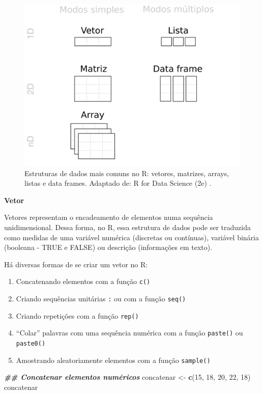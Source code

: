 \documentclass[
]{article}
\newenvironment{Shaded}{\begin{snugshade}}{\end{snugshade}}
\newcommand{\DecValTok}[1]{\textcolor[rgb]{0.00,0.00,0.81}{#1}}
\newcommand{\DocumentationTok}[1]{\textcolor[rgb]{0.56,0.35,0.01}{\textbf{\textit{#1}}}}
\newcommand{\FunctionTok}[1]{\textcolor[rgb]{0.13,0.29,0.53}{\textbf{#1}}}
\newcommand{\NormalTok}[1]{#1}
\newcommand{\OtherTok}[1]{\textcolor[rgb]{0.56,0.35,0.01}{#1}}
\providecommand{\tightlist}{%
  \setlength{\itemsep}{0pt}\setlength{\parskip}{0pt}}
\begin{document}
\begin{figure}
\includegraphics[width=20.03in]{figures/cap04_fig03} \caption{Estruturas de dados mais comuns no R: vetores, matrizes, arrays, listas e data frames. Adaptado de: R for Data Science (2e) .}\label{fig:fig-r-estruturas}
\end{figure}

\textbf{Vetor}

Vetores representam o encadeamento de elementos numa sequência unidimensional. Dessa forma, no R, essa estrutura de dados pode ser traduzida como medidas de uma variável numérica (discretas ou contínuas), variável binária (booleana - TRUE e FALSE) ou descrição (informações em texto).

Há diversas formas de se criar um vetor no R:

\begin{enumerate}
\def\labelenumi{\arabic{enumi}.}
\tightlist
\item
  Concatenando elementos com a função \texttt{c()}
\item
  Criando sequências unitárias \texttt{:} ou com a função \texttt{seq()}
\item
  Criando repetições com a função \texttt{rep()}
\item
  ``Colar'' palavras com uma sequência numérica com a função \texttt{paste()} ou \texttt{paste0()}
\item
  Amostrando aleatoriamente elementos com a função \texttt{sample()}
\end{enumerate}

\begin{Shaded}
\begin{Highlighting}[]
\DocumentationTok{\#\# Concatenar elementos numéricos}
\NormalTok{concatenar }\OtherTok{\textless{}{-}} \FunctionTok{c}\NormalTok{(}\DecValTok{15}\NormalTok{, }\DecValTok{18}\NormalTok{, }\DecValTok{20}\NormalTok{, }\DecValTok{22}\NormalTok{, }\DecValTok{18}\NormalTok{)}
\NormalTok{concatenar}
\end{Highlighting}
\end{Shaded}
\end{document}
